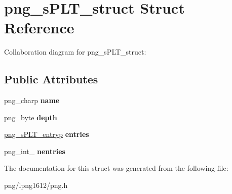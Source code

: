 \hypertarget{structpng__s_p_l_t__struct}{\section{png\+\_\+s\+P\+L\+T\+\_\+struct Struct Reference}
\label{structpng__s_p_l_t__struct}
}


Collaboration diagram for png\+\_\+s\+P\+L\+T\+\_\+struct\+:
\subsection*{Public Attributes}
\begin{DoxyCompactItemize}
\item 
\hypertarget{structpng__s_p_l_t__struct_af3b088b149e790b9b98ebedde69a70f0}{png\+\_\+charp {\bfseries name}}\label{structpng__s_p_l_t__struct_af3b088b149e790b9b98ebedde69a70f0}

\item 
\hypertarget{structpng__s_p_l_t__struct_a6e667882cd16c9675455cebd49898b22}{png\+\_\+byte {\bfseries depth}}\label{structpng__s_p_l_t__struct_a6e667882cd16c9675455cebd49898b22}

\item 
\hypertarget{structpng__s_p_l_t__struct_a4c7db13fb1a7f0ede434e174b20151ec}{\hyperlink{structpng__s_p_l_t__entry__struct}{png\+\_\+s\+P\+L\+T\+\_\+entryp} {\bfseries entries}}\label{structpng__s_p_l_t__struct_a4c7db13fb1a7f0ede434e174b20151ec}

\item 
\hypertarget{structpng__s_p_l_t__struct_ac5844e98e4c43733bad6b83b54dc7a9f}{png\+\_\+int\+\_ {\bfseries nentries}}\label{structpng__s_p_l_t__struct_ac5844e98e4c43733bad6b83b54dc7a9f}

\end{DoxyCompactItemize}


The documentation for this struct was generated from the following file\+:\begin{DoxyCompactItemize}
\item 
png/lpng1612/png.\+h\end{DoxyCompactItemize}

